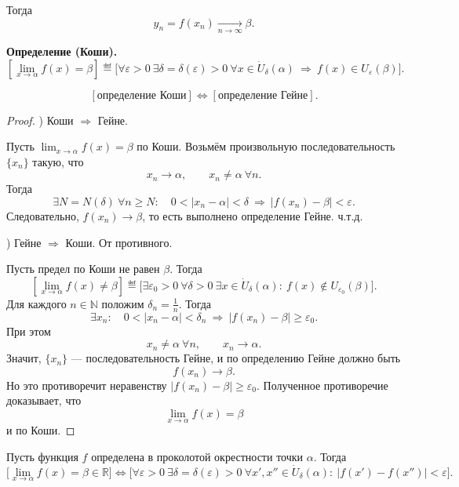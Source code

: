 \noindent Тогда
\[
y_n=f(x_n)\xrightarrow[n\to\infty]{}\beta.
\]

\noindent\textbf{Определение (Коши).}
\[
[\lim_{x\to\alpha} f(x)=\beta]
\eqdef
\bigl[\forall \varepsilon>0\ \exists \delta=\delta(\varepsilon)>0\
\forall x\in \dot U_\delta(\alpha)
\ \Rightarrow\ f(x)\in U_\varepsilon(\beta)\bigr].
\]

\begin{theorem}
\[
[\text{определение Коши}]
\iff
[\text{определение Гейне}].
\]
\end{theorem}

\begin{proof}
) Коши \(\Rightarrow\) Гейне.

Пусть \(\lim_{x\to\alpha} f(x)=\beta\) по Коши. Возьмём произвольную
последовательность \(\{x_n\}\) такую, что
\[
x_n\to\alpha,\qquad x_n\ne\alpha\ \forall n.
\]
Тогда
\[
\exists N=N(\delta)\ \forall n\ge N:\quad
0<|x_n-\alpha|<\delta
\ \Rightarrow\
|f(x_n)-\beta|<\varepsilon.
\]
Следовательно, \(f(x_n)\to\beta\), то есть выполнено определение Гейне. ч.т.д.

\medskip
{}) Гейне \(\Rightarrow\) Коши. От противного.

Пусть предел по Коши не равен \(\beta\). Тогда
\[
[\lim_{x\to\alpha} f(x)\ne\beta]
\eqdef
\bigl[\exists \varepsilon_0>0\ \forall \delta>0\
\exists x\in \dot U_\delta(\alpha):\
f(x)\notin U_{\varepsilon_0}(\beta)\bigr].
\]
Для каждого \(n\in\mathbb N\) положим \(\delta_n=\frac1n\). Тогда
\[
\exists x_n:\quad
0<|x_n-\alpha|<\delta_n
\ \Rightarrow\
|f(x_n)-\beta|\ge \varepsilon_0.
\]
При этом
\[
x_n\ne\alpha\ \forall n,\qquad x_n\to\alpha.
\]
Значит, \(\{x_n\}\) --- последовательность Гейне, и по определению Гейне должно
быть
\[
f(x_n)\to\beta.
\]
Но это противоречит неравенству \(|f(x_n)-\beta|\ge\varepsilon_0\). Полученное
противоречие доказывает, что
\[
\lim_{x\to\alpha} f(x)=\beta
\]
и по Коши.
\end{proof}


\begin{theorem}[Критерий Коши]
Пусть функция \(f\) определена в проколотой окрестности точки \(\alpha\).
Тогда
\[
\bigl[\lim_{x\to \alpha} f(x)=\beta\in\mathbb R\bigr]
\iff
\bigl[\forall \varepsilon>0\ \exists \delta=\delta(\varepsilon)>0\
\forall x',x''\in \dot U_\delta(\alpha):\
|f(x')-f(x'')|<\varepsilon\bigr].
\]
\end{theorem}

